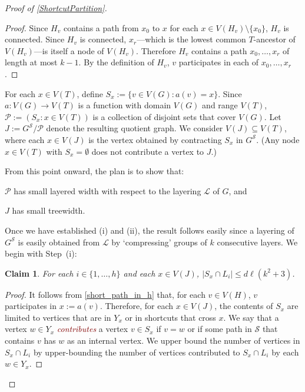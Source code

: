 \documentclass{patmorin}
\theoremstyle{plain}
\newtheorem{clm}{Claim}
\theoremstyle{definition}
\newcommand{\defin}[1]{\textcolor{Maroon}{\emph{#1}}}
\newcommand{\PP}{\mathcal{P}}
\renewcommand{\SS}{\mathcal{S}}
\renewcommand{\le}{\leqslant}
\begin{document}
\begin{proof}[Proof of \cref{ShortcutPartition}]
\begin{proof}
  Since $H_v$ contains a path from $x_0$ to $x$ for each $x\in V(H_v)\setminus\{x_0\}$,  $H_v$ is connected.  Since $H_v$ is connected, $x_r$---which is the lowest common $T$-ancestor of $V(H_v)$---is itself a node of $V(H_v)$.  Therefore $H_v$ contains a path $x_0,\ldots,x_r$ of length at most $k-1$.  By the definition of $H_v$, $v$ participates in each of $x_0,\ldots,x_r$.
\end{proof}

For each $x\in V(T)$, define $S_x := \{v\in V(G): a(v)= x\}$. Since $a:V(G)\to V(T)$ is a function with domain $V(G)$ and range $V(T)$, $\PP:=(S_x : x\in V(T))$ is a collection of disjoint sets that cover $V(G)$. Let $J:=G^\SS/\PP$ denote the resulting quotient graph. We consider $V(J)\subseteq V(T)$, where each $x\in V(J)$ is the vertex obtained by contracting $S_x$ in $G^{\SS}$. (Any node $x\in V(T)$ with $S_x=\emptyset$ does not contribute a vertex to $J$.)

From this point onward, the plan is to show that:
\begin{compactenum}[(i)]
  \item $\PP$ has small layered width with respect to the layering $\mathcal{L}$ of $G$, and
  \item $J$ has small treewidth.
\end{compactenum}
Once we have established (i) and (ii), the result follows easily since a layering of $G^\SS$ is easily obtained from $\mathcal{L}$ by `compressing' groups of $k$ consecutive layers.  We begin with Step~(i):

\begin{clm}
  \label{general-width}
  For each $i\in\{1,\ldots,h\}$ and each $x\in V(J)$, $|S_x\cap L_i|\le d\ell(k^2+3)$.
\end{clm}

\begin{proof}
  It follows from \cref{short_path_in_h} that, for each $v\in V(H)$, $v$ participates in $x:=a(v)$.  Therefore, for each $x\in V(J)$, the contents of $S_x$ are limited to vertices that are in $Y_x$ or in shortcuts that cross $x$.  We say that a vertex $w\in Y_x$ \defin{contributes} a vertex $v\in S_x$ if $v=w$ or if some path in $\SS$ that contains $v$ has $w$ as an internal vertex.  We upper bound the number of vertices in $S_x\cap L_i$ by upper-bounding the number of vertices contributed to $S_x\cap L_i$ by each $w\in Y_x$.


\end{proof}
\end{proof}
\end{document}
